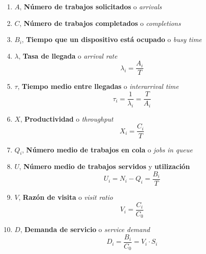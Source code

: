 \documentclass[10pt,spanish, landscape, twocolumn]{article}
\begin{document}
\begin{enumerate}[$\bullet$]
    \item $A$, \textbf{Número de trabajos solicitados} o \textit{arrivals}
    \item $C$, \textbf{Número de trabajos completados} o \textit{completions}
    \item $B_i$, \textbf{Tiempo que un dispositivo está ocupado} o \textit{busy time}
    \item $\lambda$, \textbf{Tasa de llegada} o \textit{arrival rate}
    \begin{displaymath}
        \lambda_i = \frac{A_i}{T}
    \end{displaymath}
    \item $\tau$, \textbf{Tiempo medio entre llegadas} o \textit{interarrival time}
    \begin{displaymath}
        \tau_i = \frac{1}{\lambda_i} = \frac{T}{A_i}
    \end{displaymath}
    \item $X$, \textbf{Productividad} o \textit{throughput}
    \begin{displaymath}
        X_i = \frac{C_i}{T}
    \end{displaymath}
    \item $Q_i$, \textbf{Número medio de trabajos en cola} o \textit{jobs in queue}
    \item $U$, \textbf{Número medio de trabajos servidos} y \textbf{utilización}
    \begin{displaymath}
        U_i = N_i - Q_i = \frac{B_i}{T}
    \end{displaymath}
    \item $V$, \textbf{Razón de visita} o \textit{visit ratio}
    \begin{displaymath}
        V_i = \frac{C_i}{C_0}
    \end{displaymath}
    \item $D$, \textbf{Demanda de servicio} o \textit{service demand}
    \begin{displaymath}
        D_i = \frac{B_i}{C_0} = V_i \cdot S_i
    \end{displaymath}
\end{enumerate}

\newpage
\end{document}
